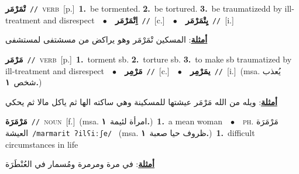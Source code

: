 \documentclass[10pt,a4paper,twoside]{article} %
\begin{document}
\begin{multicols}{2}
{\setlength\topsep{0pt}\textbf{\foreignlanguage{arabic}{تْمَرْمَر}}\ {\color{gray}\texttt{//}\color{black}}\ \textsc{verb}\ [p.]\ \textbf{1.}~be tormented.  \textbf{2.}~be tortured.  \textbf{3.}~be traumatizedd by ill-treatment and disrespect\ \ $\bullet$\ \ \setlength\topsep{0pt}\textbf{\foreignlanguage{arabic}{اِتْمَرْمَر}}\ {\color{gray}\texttt{//}\color{black}}\ [c.]\ \ $\bullet$\ \ \setlength\topsep{0pt}\textbf{\foreignlanguage{arabic}{يِتْمَرْمَر}}\ {\color{gray}\texttt{//}\color{black}}\ [i.]\  \begin{flushright}\color{gray}\foreignlanguage{arabic}{\textbf{\underline{\foreignlanguage{arabic}{أمثلة}}}: المسكين تْمَرْمَر وهو يراكض من مسشتفى لمستشفى}\end{flushright}\color{black}} \vspace{2mm}

{\setlength\topsep{0pt}\textbf{\foreignlanguage{arabic}{مَرْمَر}}\ {\color{gray}\texttt{//}\color{black}}\ \textsc{verb}\ [p.]\ \textbf{1.}~torment sb.  \textbf{2.}~torture sb.  \textbf{3.}~to make sb traumatized by ill-treatment and disrespect\ \ $\bullet$\ \ \setlength\topsep{0pt}\textbf{\foreignlanguage{arabic}{مَرْمِر}}\ {\color{gray}\texttt{//}\color{black}}\ [c.]\ \ $\bullet$\ \ \setlength\topsep{0pt}\textbf{\foreignlanguage{arabic}{يمَرْمِر}}\ {\color{gray}\texttt{//}\color{black}}\ [i.]\ \color{gray}(msa. \foreignlanguage{arabic}{يُعذب شخص}~\foreignlanguage{arabic}{\textbf{١.}})\color{black}\  \begin{flushright}\color{gray}\foreignlanguage{arabic}{\textbf{\underline{\foreignlanguage{arabic}{أمثلة}}}: ويله من الله مَرْمَر عيشتها للمسكينة وهي ساكته الها ثم ياكل مالا ثم يحكي}\end{flushright}\color{black}} \vspace{2mm}

{\setlength\topsep{0pt}\textbf{\foreignlanguage{arabic}{مَرْمَرَة}}\ {\color{gray}\texttt{//}\color{black}}\ \textsc{noun}\ [f.]\ \color{gray}(msa. \foreignlanguage{arabic}{امرأة لئيمة}~\foreignlanguage{arabic}{\textbf{١.}})\color{black}\ \textbf{1.}~a mean woman\ \ $\bullet$\ \ \textsc{ph.} \color{gray} \foreignlanguage{arabic}{مَرْمَرَة العيشة}\color{black}\ {\color{gray}\texttt{/{\sffamily marmarit ʔilʕiːʃe}/}\color{black}}\ \color{gray} (msa. \foreignlanguage{arabic}{ظروف حيا صعبة}~\foreignlanguage{arabic}{\textbf{١.}})\color{black}\ \textbf{1.}~difficult circumstances in life\  \begin{flushright}\color{gray}\foreignlanguage{arabic}{\textbf{\underline{\foreignlanguage{arabic}{أمثلة}}}: في مرة ومرمرة ومُسمار في العُنْطَرَة}\end{flushright}\color{black}} \vspace{2mm}


\end{multicols}
\end{document}
